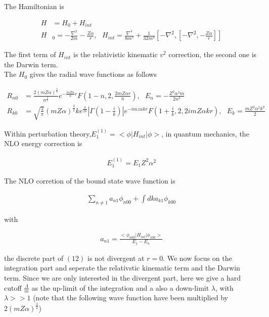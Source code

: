 \documentclass{article}
\begin{document}
The Hamiltonian is

\begin{align}
	H & =H_0+H_{int}                                                                                                                            \\
	H & _0=-\frac{\nabla^2}{2m}-\frac{Z\alpha}{r},\ \ \ H_{int}=\frac{\nabla^4}{8m^3}+\frac{1}{32m^4}[-\nabla^2,[-\nabla^2,-\frac{Z\alpha}{r}]]
\end{align}

The first term of $H_{int}$ is the relativistic kinematic $v^2$ correction, the second one is the Darwin term.\\
The $H_0$ gives the radial wave functions as follows

\begin{align}
	R_{n0} & =\frac{2(mZ\alpha)^\frac{3}{2}}{n^\frac{3}{2}}e^{-\frac{mZ\alpha}{n}r}F(1-n,2,\frac{2mZ\alpha r}{n}),\ \ \ E_n=-\frac{Z^2\alpha^2m}{2n^2}                                \\
	R_{k0} & =\sqrt{\frac{2}{\pi}}(mZ\alpha)^\frac{3}{2}ke^\frac{\pi}{2k}|\Gamma(1-\frac{i}{k})|e^{-imz\alpha kr}F(1+\frac{i}{k},2,2imZ\alpha kr),\ \ \ E_k=\frac{mZ^2\alpha^2k^2}{2}
\end{align}

Within perturbation theory,$E_1^{(1)}=<\phi|H_{int}|\phi>$, in quantum mechanics, the NLO energy correction is

\begin{align}
	E_1^{(1)}=E_1Z^2\alpha^2
\end{align}

The NLO corretion of the bound state wave function is

\begin{align}
	\sum_{n\neq 1}a_{n1}\phi_{n00}+\int dka_{k1}\phi_{k00}
\end{align}

with

\begin{align}
	a_{n1}=\frac{<\phi_{n00}|H_{int}|\phi_{100}>}{E_1-E_n}
\end{align}

the discrete part of $(12)$ is not divergent at $r=0$. We now focus on the integration part and seperate the relativstic kinematic term and the Darwin term. Since we are only interested in the divergent part, here we give a hard cutoff $\frac{\Lambda}{m}$ as the up-limit of the integration and a also a down-limit $\lambda$, with $\lambda>>1$ (note that the following wave function have been multiplied by $2(mZ\alpha)^\frac{3}{2}$)
\end{document}
